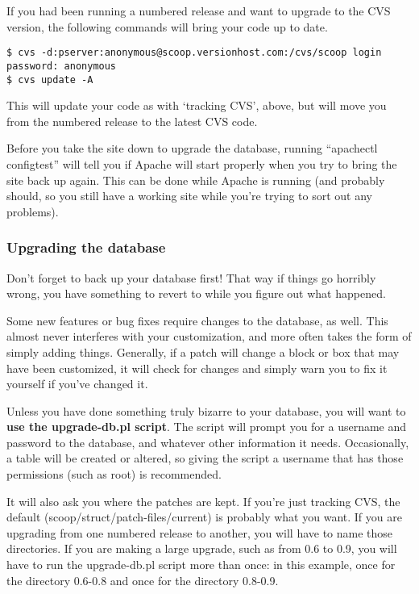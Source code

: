 If you had been running a numbered release and want to upgrade to the CVS version, the following commands will bring your code up to date.

\begin{verbatim}
$ cvs -d:pserver:anonymous@scoop.versionhost.com:/cvs/scoop login
password: anonymous
$ cvs update -A
\end{verbatim}

This will update your code as with `tracking CVS', above, but will move you from the numbered release to the latest CVS code.

Before you take the site down to upgrade the database, running ``apachectl configtest'' will tell you if Apache will start properly when you try to bring the site back up again.  This can be done while Apache is running (and probably should, so you still have a working site while you're trying to sort out any problems).

\subsubsection{Upgrading the database}
\label{upgrading-db}

Don't forget to back up your database first! That way if things go horribly wrong, you have something to revert to while you figure out what happened.

Some new features or bug fixes require changes to the database, as well.  This almost never interferes with your customization, and more often takes the form of simply adding things.  Generally, if a patch will change a block or box that may have been customized, it will check for changes and simply warn you to fix it yourself if you've changed it.

Unless you have done something truly bizarre to your database, you will want to {\bf use the upgrade-db.pl script}.  The script will prompt you for a username and password to the database, and whatever other information it needs.  Occasionally, a table will be created or altered, so giving the script a username that has those permissions (such as root) is recommended.

It will also ask you where the patches are kept.  If you're just tracking CVS, the default (scoop/struct/patch-files/current) is probably what you want.  If you are upgrading from one numbered release to another, you will have to name those directories.  If you are making a large upgrade, such as from 0.6 to 0.9, you will have to run the upgrade-db.pl script more than once: in this example, once for the directory 0.6-0.8 and once for the directory 0.8-0.9.

